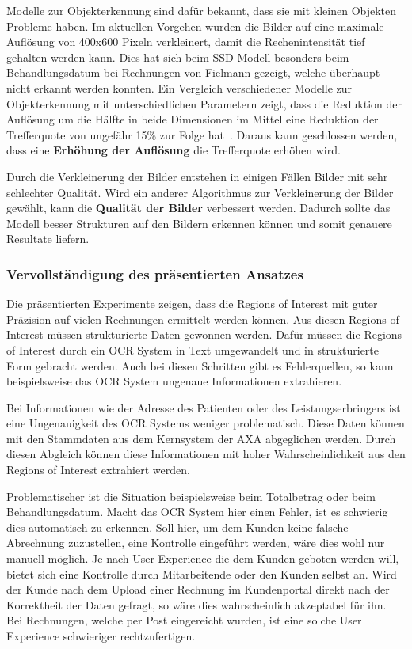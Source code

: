 Modelle zur Objekterkennung sind dafür bekannt, dass sie mit kleinen Objekten Probleme haben. Im aktuellen Vorgehen wurden die Bilder auf eine maximale Auflösung von 400x600 Pixeln verkleinert, damit die Rechenintensität tief gehalten werden kann. Dies hat sich beim SSD Modell besonders beim Behandlungsdatum bei Rechnungen von Fielmann gezeigt, welche überhaupt nicht erkannt werden konnten. Ein Vergleich verschiedener Modelle zur Objekterkennung mit unterschiedlichen Parametern zeigt, dass die Reduktion der Auflösung um die Hälfte in beide Dimensionen im Mittel eine Reduktion der Trefferquote von ungefähr 15\% zur Folge hat~\autocite{SSDFRCNN}. Daraus kann geschlossen werden, dass eine \textbf{Erhöhung der Auflösung} die Trefferquote erhöhen wird.

Durch die Verkleinerung der Bilder entstehen in einigen Fällen Bilder mit sehr schlechter Qualität. Wird ein anderer Algorithmus zur Verkleinerung der Bilder gewählt, kann die \textbf{Qualität der Bilder} verbessert werden. Dadurch sollte das Modell besser Strukturen auf den Bildern erkennen können und somit genauere Resultate liefern.

\subsubsection{Vervollständigung des präsentierten Ansatzes}
\label{chap:ie-quality-check}

Die präsentierten Experimente zeigen, dass die Regions of Interest mit guter Präzision auf vielen Rechnungen ermittelt werden können. Aus diesen Regions of Interest müssen strukturierte Daten gewonnen werden. Dafür müssen die Regions of Interest durch ein OCR System in Text umgewandelt und in strukturierte Form gebracht werden. Auch bei diesen Schritten gibt es Fehlerquellen, so kann beispielsweise das OCR System ungenaue Informationen extrahieren.

Bei Informationen wie der Adresse des Patienten oder des Leistungserbringers ist eine Ungenauigkeit des OCR Systems weniger problematisch. Diese Daten können mit den Stammdaten aus dem Kernsystem der AXA abgeglichen werden. Durch diesen Abgleich können diese Informationen mit hoher Wahrscheinlichkeit aus den Regions of Interest extrahiert werden.

Problematischer ist die Situation beispielsweise beim Totalbetrag oder beim Behandlungsdatum. Macht das OCR System hier einen Fehler, ist es schwierig dies automatisch zu erkennen. Soll hier, um dem Kunden keine falsche Abrechnung zuzustellen, eine Kontrolle eingeführt werden, wäre dies wohl nur manuell möglich. Je nach User Experience die dem Kunden geboten werden will, bietet sich eine Kontrolle durch Mitarbeitende oder den Kunden selbst an. Wird der Kunde nach dem Upload einer Rechnung im Kundenportal direkt nach der Korrektheit der Daten gefragt, so wäre dies wahrscheinlich akzeptabel für ihn. Bei Rechnungen, welche per Post eingereicht wurden, ist eine solche User Experience schwieriger rechtzufertigen.




